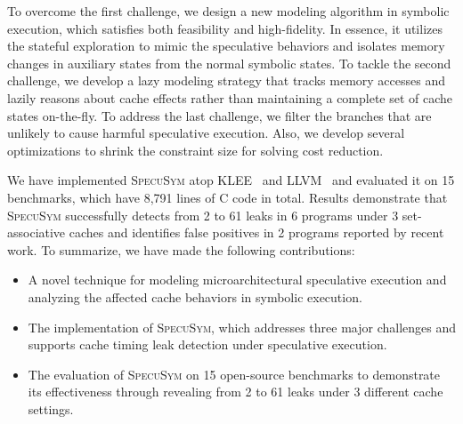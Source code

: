 \documentclass[sigconf,screen]{acmart}
\newcommand\ignore[1]{}
\newcommand{\SpecuSym}{\textsc{SpecuSym} }
\begin{document}
To overcome the first challenge, we design a new modeling algorithm in symbolic 
execution, which satisfies both feasibility and high-fidelity. In essence, it 
utilizes the stateful exploration to mimic the speculative behaviors and isolates 
memory changes in auxiliary states from the normal symbolic states.
%
To tackle the second challenge, we develop a lazy modeling strategy that tracks 
memory accesses and lazily reasons about cache effects rather than maintaining a 
complete set of cache states on-the-fly. 
%
To address the last challenge, we filter the branches that are unlikely to cause 
harmful speculative execution. Also, we develop several optimizations to shrink 
the constraint size for solving cost reduction.



\ignore{
Also, We develop a merging schema between the mimicked states and regular symbolic 
states to accumulate the cache side effects.

In general, we decompose the precise but lengthy constraint into smaller chunks 
without losing correctness, as well as utilizing executor kernel characteristics 
for faster computation.

However, the side effects caused by speculative execution are normally undetectable 
under standard symbolic execution. To overcome this problem, we introduce the 
$\mathit{speculative~modeling}$ into symbolic execution. Thus, cache side effects 
are visible and cache timing leaks from speculative execution detectable now. 
}


We have implemented \SpecuSym atop KLEE~\cite{CadarDE08} and LLVM~\cite{LattnerA04} 
and evaluated it on 15 benchmarks, which have 8,791 lines of C code in total. Results 
demonstrate that \SpecuSym successfully detects from 2 to 61 leaks in 6 programs under
3 set-associative caches and identifies false positives in 2 programs reported by 
recent work. To summarize, we have made the following contributions:


\begin{itemize}
  \item 
    A novel technique for modeling microarchitectural speculative execution and	
		analyzing the affected cache behaviors in symbolic execution.
  \item 
		The implementation of \textsc{SpecuSym}, which addresses three major challenges
		and supports cache timing leak detection under speculative execution. 
  \item 
    The evaluation of \SpecuSym on 15 open-source benchmarks to demonstrate its 
    effectiveness through revealing from 2 to 61 leaks under 3 different cache 
		settings.
\end{itemize}
\end{document}
